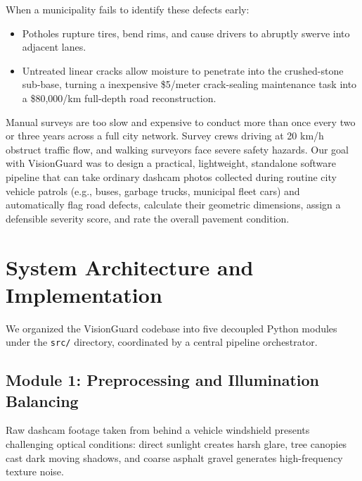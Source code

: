 \documentclass[11pt,a4paper]{article}
\begin{document}
When a municipality fails to identify these defects early:
\begin{itemize}[noitemsep]
    \item Potholes rupture tires, bend rims, and cause drivers to abruptly swerve into adjacent lanes.
    \item Untreated linear cracks allow moisture to penetrate into the crushed-stone sub-base, turning a inexpensive \$5/meter crack-sealing maintenance task into a \$80,000/km full-depth road reconstruction.
\end{itemize}

Manual surveys are too slow and expensive to conduct more than once every two or three years across a full city network. Survey crews driving at 20 km/h obstruct traffic flow, and walking surveyors face severe safety hazards. Our goal with VisionGuard was to design a practical, lightweight, standalone software pipeline that can take ordinary dashcam photos collected during routine city vehicle patrols (e.g., buses, garbage trucks, municipal fleet cars) and automatically flag road defects, calculate their geometric dimensions, assign a defensible severity score, and rate the overall pavement condition.

\section{System Architecture and Implementation}
We organized the VisionGuard codebase into five decoupled Python modules under the \texttt{src/} directory, coordinated by a central pipeline orchestrator.

\subsection{Module 1: Preprocessing and Illumination Balancing}
Raw dashcam footage taken from behind a vehicle windshield presents challenging optical conditions: direct sunlight creates harsh glare, tree canopies cast dark moving shadows, and coarse asphalt gravel generates high-frequency texture noise. 
\end{document}
